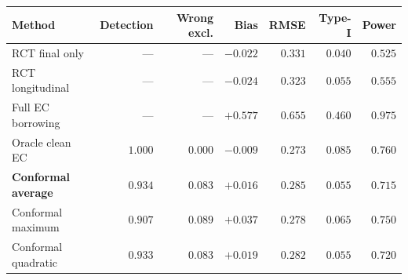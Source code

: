 \documentclass[border=8pt]{standalone}
\begin{document}
\renewcommand{\arraystretch}{1.30}\large\begin{tabular}{lrrrrrr}
\toprule
Method & Detection & Wrong excl. & Bias & RMSE & Type-I & Power\\
\midrule
RCT final only & --- & --- & $-0.022$ & $0.331$ & $0.040$ & $0.525$\\
RCT longitudinal & --- & --- & $-0.024$ & $0.323$ & $0.055$ & $0.555$\\
Full EC borrowing & --- & --- & $+0.577$ & $0.655$ & $0.460$ & $0.975$\\
Oracle clean EC & $1.000$ & $0.000$ & $-0.009$ & $0.273$ & $0.085$ & $0.760$\\
\midrule
\textbf{Conformal average} & $\bm{0.934}$ & $\bm{0.083}$ & $\bm{+0.016}$ & $\bm{0.285}$ & $\bm{0.055}$ & $\bm{0.715}$\\
Conformal maximum & $0.907$ & $0.089$ & $+0.037$ & $0.278$ & $0.065$ & $0.750$\\
Conformal quadratic & $0.933$ & $0.083$ & $+0.019$ & $0.282$ & $0.055$ & $0.720$\\
\bottomrule
\end{tabular}
\end{document}
